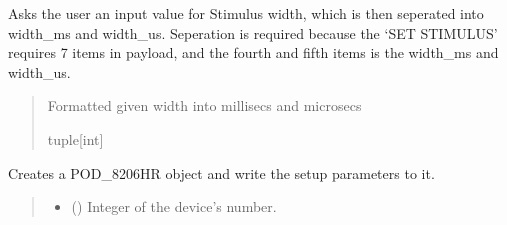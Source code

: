 \documentclass[letterpaper,10pt,english]{sphinxmanual}
\begin{document}
\begin{fulllineitems}
\begin{fulllineitems}
\label{\detokenize{Setup.SetupOneDevice:Setup.SetupOneDevice.Setup_8480SC.Setup8480SC._ChooseWidth}}
\pysigstartsignatures
{}
\pysigstopsignatures
\sphinxAtStartPar
Asks the user an input value for Stimulus width, which is then seperated into width\_ms and width\_us.         Seperation is required because the ‘SET STIMULUS’ requires 7 items in payload, and the fourth and fifth items         is the width\_ms and width\_us.
\begin{quote}\begin{description}
\sphinxAtStartPar
Formatted given width into millisecs and microsecs

\sphinxAtStartPar
tuple{[}int{]}

\end{description}\end{quote}

\end{fulllineitems}


\begin{fulllineitems}
\label{\detokenize{Setup.SetupOneDevice:Setup.SetupOneDevice.Setup_8480SC.Setup8480SC._ConnectPODdevice}}
\pysigstartsignatures
{}
\pysigstopsignatures
\sphinxAtStartPar
Creates a POD\_8206HR object and write the setup parameters to it.
\begin{quote}\begin{description}
\begin{itemize}
\item {} 
\sphinxAtStartPar
{} () \textendash{} Integer of the device’s number.


\end{itemize}
\end{description}
\end{quote}
\end{fulllineitems}
\end{fulllineitems}
\end{document}

